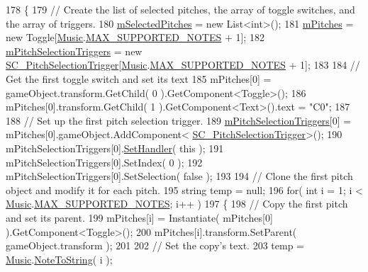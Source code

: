 \begin{DoxyCode}
178     \{
179         \textcolor{comment}{// Create the list of selected pitches, the array of toggle switches, and the array of triggers.}
180         \hyperlink{group___s_c___p_s_c_priv_var_ga5a8a5c31158f6af7f0c17d4fd03c5641}{mSelectedPitches} = \textcolor{keyword}{new} List<int>();
181         \hyperlink{group___s_c___p_s_c_priv_var_ga25180add92621da773b024083d3a61af}{mPitches} = \textcolor{keyword}{new} Toggle[\hyperlink{class_music}{Music}.\hyperlink{group___music_constants_gaaf07da909a12e9fec0e43b70864f27b7}{MAX\_SUPPORTED\_NOTES} + 1];
182         \hyperlink{group___s_c___p_s_c_priv_var_ga8431846d376b98bc6de5a872cce2c596}{mPitchSelectionTriggers} = \textcolor{keyword}{new} 
      \hyperlink{class_s_c___pitch_selection_trigger}{SC\_PitchSelectionTrigger}[\hyperlink{class_music}{Music}.\hyperlink{group___music_constants_gaaf07da909a12e9fec0e43b70864f27b7}{MAX\_SUPPORTED\_NOTES} + 1];
183 
184         \textcolor{comment}{// Get the first toggle switch and set its text}
185         mPitches[0] = gameObject.transform.GetChild( 0 ).GetComponent<Toggle>();
186         mPitches[0].transform.GetChild( 1 ).GetComponent<Text>().text = \textcolor{stringliteral}{"C0"};
187 
188         \textcolor{comment}{// Set up the first pitch selection trigger.}
189         \hyperlink{group___s_c___p_s_c_priv_var_ga8431846d376b98bc6de5a872cce2c596}{mPitchSelectionTriggers}[0] = mPitches[0].gameObject.AddComponent<
      \hyperlink{class_s_c___pitch_selection_trigger}{SC\_PitchSelectionTrigger}>();
190         mPitchSelectionTriggers[0].\hyperlink{group___s_c___p_s_t_pub_func_ga0b334518dbdac5874adf9436cd2c7fed}{SetHandler}( \textcolor{keyword}{this} );
191         mPitchSelectionTriggers[0].SetIndex( 0 );
192         mPitchSelectionTriggers[0].SetSelection( \textcolor{keyword}{false} );
193 
194         \textcolor{comment}{// Clone the first pitch object and modify it for each pitch.}
195         \textcolor{keywordtype}{string} temp = null;
196         \textcolor{keywordflow}{for}( \textcolor{keywordtype}{int} i = 1; i < \hyperlink{class_music}{Music}.\hyperlink{group___music_constants_gaaf07da909a12e9fec0e43b70864f27b7}{MAX\_SUPPORTED\_NOTES}; i++ )
197         \{
198             \textcolor{comment}{// Copy the first pitch and set its parent.}
199             mPitches[i] = Instantiate( mPitches[0] ).GetComponent<Toggle>();
200             mPitches[i].transform.SetParent( gameObject.transform );
201 
202             \textcolor{comment}{// Set the copy's text.}
203             temp = \hyperlink{class_music}{Music}.\hyperlink{group___music_stat_func_ga85a22c905d56d4c5f4e62159bfecee8c}{NoteToString}( i );

\end{DoxyCode}
